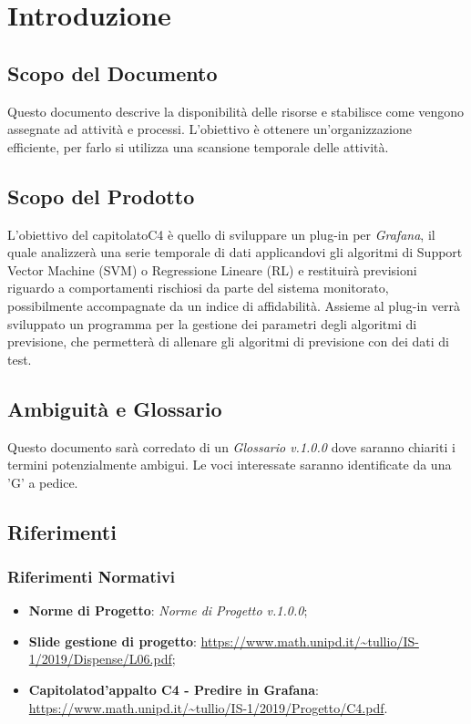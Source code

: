 \section{Introduzione}
	\subsection{Scopo del Documento}
		Questo documento descrive la disponibilità delle risorse e stabilisce come vengono assegnate ad attività e processi. L'obiettivo è ottenere un'organizzazione efficiente, per farlo si utilizza una scansione temporale delle attività.
	\subsection{Scopo del Prodotto}
		L'obiettivo del capitolato\glo C4 è quello di sviluppare un plug-in per \textit{Grafana\glo}, il quale analizzerà una serie temporale di dati applicandovi gli algoritmi di Support Vector Machine (SVM) o Regressione Lineare (RL) e restituirà previsioni riguardo a comportamenti rischiosi da parte del sistema monitorato, possibilmente accompagnate da un indice di affidabilità. Assieme al plug-in verrà sviluppato un programma per la gestione dei parametri degli algoritmi di previsione, che permetterà di allenare gli algoritmi di previsione con dei dati di test.
	\subsection{Ambiguità e Glossario}
		Questo documento sarà corredato di un \textit{Glossario v.1.0.0} dove saranno chiariti i termini potenzialmente ambigui.
		Le voci interessate saranno identificate da una 'G' a pedice.
	\subsection{Riferimenti}
		\subsubsection{Riferimenti Normativi}
			\begin{itemize}
				\item \textbf{Norme di Progetto}: \textit{Norme di Progetto v.1.0.0};
				\item \textbf{Slide gestione di progetto}: \url{https://www.math.unipd.it/~tullio/IS-1/2019/Dispense/L06.pdf};
				\item \textbf{Capitolato\glosp d'appalto C4 - Predire in Grafana}:  \url{https://www.math.unipd.it/~tullio/IS-1/2019/Progetto/C4.pdf}.
			\end{itemize}
